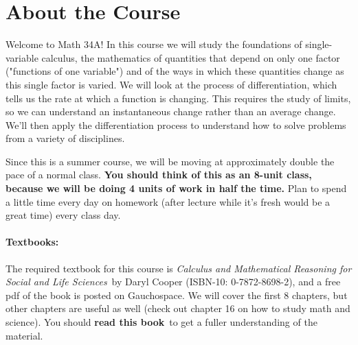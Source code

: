 \documentclass[11pt,letterpaper]{article}
\begin{document}
\section*{About the Course}
Welcome to Math 34A! In this course we will study the foundations of single-variable calculus, the mathematics of quantities that depend on only one factor ("functions of one variable") and of the ways in which these quantities change as this single factor is varied. We will look at the process of differentiation, which tells us the rate at which a function is changing. This requires the study of limits, so we can understand an instantaneous change rather than an average change. We'll then apply the differentiation process to understand how to solve problems from a variety of disciplines. 

Since this is a summer course, we will be moving at approximately double the pace of a normal class. \textbf{You should think of this as an 8-unit class, because we will be doing 4 units of work in half the time.} Plan to spend a little time every day on homework (after lecture while it's fresh would be a great time) every class day. 



\paragraph*{Textbooks:}
The required textbook for this course is \emph{Calculus and
  Mathematical Reasoning for Social and Life Sciences}\ by Daryl
Cooper (ISBN-10: 0-7872-8698-2), and a free pdf of the book is posted on Gauchospace.  We will cover the first 8 chapters, but other chapters are useful as well (check out chapter 16 on how to study math
and science).  You should \textbf{read this book}\ to get a fuller
understanding of the material.

\pagebreak
\end{document}
